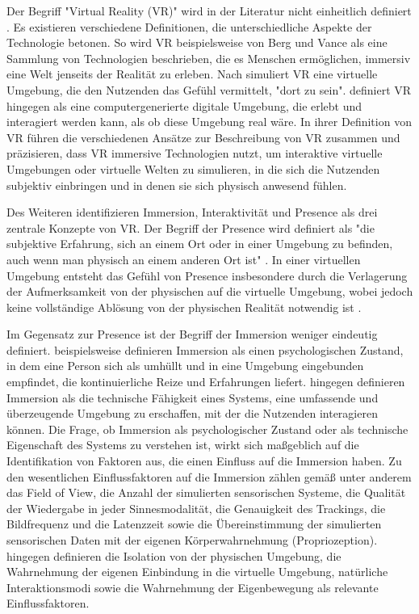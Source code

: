 Der Begriff "Virtual Reality (VR)" wird in der Literatur nicht einheitlich definiert \citep{wohlgenannt_virtual_2020}. Es existieren verschiedene Definitionen, die unterschiedliche Aspekte der Technologie betonen. So wird VR beispielsweise von Berg und Vance als eine Sammlung von Technologien beschrieben, die es Menschen ermöglichen, immersiv eine Welt jenseits der Realität zu erleben. 
Nach \citet{bowman_virtual_2007} simuliert VR eine virtuelle Umgebung, die den Nutzenden das Gefühl vermittelt, "dort zu sein". \citet{jerald_vr_2016} definiert VR hingegen als eine computergenerierte digitale Umgebung, die erlebt und interagiert werden kann, als ob diese Umgebung real wäre. In ihrer Definition von VR führen \citet{wohlgenannt_virtual_2020} die verschiedenen Ansätze zur Beschreibung von VR zusammen und präzisieren, dass VR immersive Technologien nutzt, um interaktive virtuelle Umgebungen oder virtuelle Welten zu simulieren, in die sich die Nutzenden subjektiv einbringen und in denen sie sich physisch anwesend fühlen.

Des Weiteren identifizieren \citet{walsh_virtual_2002} Immersion, Interaktivität und Presence als drei zentrale Konzepte von VR. Der Begriff der Presence wird definiert als "die subjektive Erfahrung, sich an einem Ort oder in einer Umgebung zu befinden, auch wenn man physisch an einem anderen Ort ist" \citep{witmer_measuring_1998}. In einer virtuellen Umgebung entsteht das Gefühl von Presence insbesondere durch die Verlagerung der Aufmerksamkeit von der physischen auf die virtuelle Umgebung, wobei jedoch keine vollständige Ablösung von der physischen Realität notwendig ist \citep{witmer_measuring_1998}. 

Im Gegensatz zur Presence ist der Begriff der Immersion weniger eindeutig definiert. \citet{witmer_measuring_1998} beispielsweise definieren Immersion als einen psychologischen Zustand, in dem eine Person sich als umhüllt und in eine Umgebung eingebunden empfindet, die kontinuierliche Reize und Erfahrungen liefert. \citet{sanchez-vives_presence_2005} hingegen definieren Immersion als die technische Fähigkeit eines Systems, eine umfassende und überzeugende Umgebung zu erschaffen, mit der die Nutzenden interagieren können. 
Die Frage, ob Immersion als psychologischer Zustand oder als technische Eigenschaft des Systems zu verstehen ist, wirkt sich maßgeblich auf die Identifikation von Faktoren aus, die einen Einfluss auf die Immersion haben. 
Zu den wesentlichen Einflussfaktoren auf die Immersion zählen gemäß  \citet{sanchez-vives_presence_2005} unter anderem das Field of View, die Anzahl der simulierten sensorischen Systeme, die Qualität der Wiedergabe in jeder Sinnesmodalität, die Genauigkeit des Trackings, die Bildfrequenz und die Latenzzeit sowie die Übereinstimmung der simulierten sensorischen Daten mit der eigenen Körperwahrnehmung (Propriozeption). \citet{witmer_measuring_1998} hingegen definieren die Isolation von der physischen Umgebung, die Wahrnehmung der eigenen Einbindung in die virtuelle Umgebung, natürliche Interaktionsmodi sowie die Wahrnehmung der Eigenbewegung als relevante Einflussfaktoren. 

